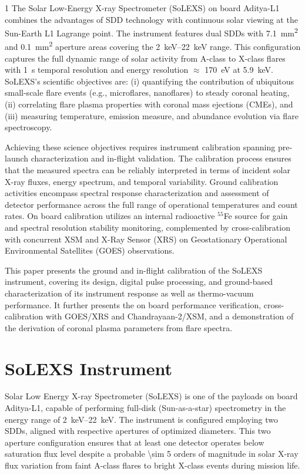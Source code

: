 \documentclass[12pt]{spieman}  %
\begin{document}
\begin{spacing}{1}
The Solar Low-Energy X-ray Spectrometer (SoLEXS) on board Aditya-L1 \cite{Sankarasubramanian2025} combines the advantages of SDD technology with continuous solar viewing at the Sun-Earth L1 Lagrange point. The instrument features dual SDDs with \SI{7.1}{\milli\metre\squared} and \SI{0.1}{\milli\metre\squared} aperture areas covering the \SIrange{2}{22}{\keV} range.
This configuration captures the full dynamic range of solar activity from A-class to X-class flares with \SI{1}{\second} temporal resolution and energy resolution $\approx$ \SI{170}{\electronvolt} at \SI{5.9}{\keV}. SoLEXS's scientific objectives are: 
(i) quantifying the contribution of ubiquitous small-scale flare events (e.g., microflares, nanoflares) to steady coronal heating,
(ii) correlating flare plasma properties with coronal mass ejections (CMEs), and 
(iii) measuring temperature, emission measure, and abundance evolution via flare spectroscopy.


Achieving these science objectives requires instrument calibration spanning pre-launch characterization and in-flight validation. The calibration process ensures that the measured spectra can be reliably interpreted in terms of incident solar X-ray fluxes, energy spectrum, and temporal variability. Ground calibration activities encompass spectral response characterization and assessment of detector performance across the full range of operational temperatures and count rates. On board calibration utilizes an internal radioactive $^{55}$Fe source for gain and spectral resolution stability monitoring, complemented by cross-calibration with concurrent XSM and X-Ray Sensor (XRS) on Geostationary Operational Environmental Satellites (GOES) \cite{Chamberlin2009} observations.


This paper presents the ground and in-flight calibration of the SoLEXS instrument, covering its design, digital pulse processing, and ground-based characterization of its instrument response as well as thermo-vacuum performance. 
It further presents the on board performance verification, cross-calibration with GOES/XRS and Chandrayaan-2/XSM, and a demonstration of the derivation of coronal plasma parameters from flare spectra.

\section{SoLEXS Instrument} \label{sect:instrument}

Solar Low Energy X-ray Spectrometer (SoLEXS) \cite{Sankarasubramanian2025} is one of the payloads on board Aditya-L1, capable of performing full-disk (Sun-as-a-star) spectrometry in the energy range of \SIrange{2}{22}{\keV}.
The instrument is configured employing two SDDs, aligned with respective apertures of optimized diameters.
This two aperture configuration ensures that at least one detector operates below saturation flux level despite a probable \num{\sim 5} orders of magnitude in solar X-ray flux variation from faint A-class flares to bright X-class events during mission life.


\end{spacing}
\end{document}

